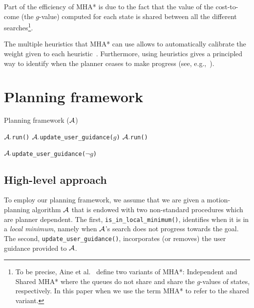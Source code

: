 \documentclass[conference]{IEEEtran}
\begin{document}
Part of the efficiency of MHA* is due to the fact that the value of the cost-to-come (the $g$-value) computed for each state is shared between all the different searches\footnote{To be precise, Aine et al.~\cite{ASNHL16} define two variants of MHA*: Independent and Shared MHA* where the queues do not share and share the $g$-values of states, respectively. In this paper when we use the term MHA* to refer to the shared variant.}.

The multiple heuristics that MHA* can use allows to automatically calibrate the weight given to each heuristic~\cite{PNAL15}.
Furthermore, using heuristics gives a principled way to identify when the planner ceases to make progress (see, e.g.,~\cite{VNL17}).

\section{Planning framework}
\label{sec:planning}
\algrenewcommand\algorithmicindent{.8em}
\begin{algorithm}[tb]
\caption{Planning framework ($\mathcal{A}$)}
\label{alg:main}	
\begin{algorithmic}[1]
\small
{} 
		\State $\mathcal{A}.$\texttt{run()}
	\EndWhile
%	
	\State $\mathcal{A}.$\texttt{update\_user\_guidance($g$)}
		\State $\mathcal{A}.$\texttt{run()}
	\EndWhile

	\State $\mathcal{A}.$\texttt{update\_user\_guidance($\neg g$)}
\EndWhile
\end{algorithmic}
\end{algorithm}

\subsection{High-level approach}
\label{sec:high}
To employ our planning framework, we assume that we are given a motion-planning algorithm $\mathcal{A}$ that is endowed with two non-standard procedures which are planner dependent.
The first, \texttt{is\_in\_local\_minimum()}, 
identifies when it is in a \emph{local minimum}, namely when $\mathcal{A}$'s search does not progress towards the goal. 
The second, \texttt{update\_user\_guidance()}, 
incorporates (or removes) the user guidance provided to $\mathcal{A}$. 
\end{document}
